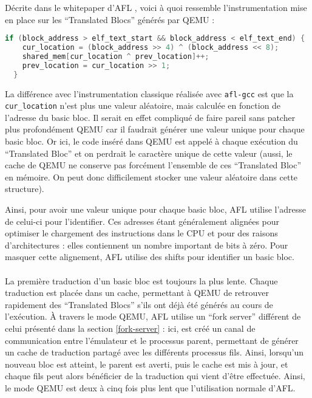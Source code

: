 Décrite dans le whitepaper d'AFL \cite[section 12 : ``Binary only instrumentation'']{technical-details}, voici à quoi ressemble l'instrumentation mise en place sur les ``Translated Blocs'' générés par QEMU :
\begin{lstlisting}[language=C]
  if (block_address > elf_text_start && block_address < elf_text_end) {
    cur_location = (block_address >> 4) ^ (block_address << 8);
    shared_mem[cur_location ^ prev_location]++;
    prev_location = cur_location >> 1;
  }
\end{lstlisting}

La différence avec l'instrumentation classique réalisée avec \lstinline{afl-gcc} est que la \lstinline{cur_location} n'est plus une valeur aléatoire, mais calculée en fonction de l'adresse du basic bloc.
Il serait en effet compliqué de faire pareil sans patcher plus profondément QEMU car il faudrait générer une valeur unique pour chaque basic bloc.
Or ici, le code inséré dans QEMU est appelé à chaque exécution du ``Translated Bloc'' et on perdrait le caractère unique de cette valeur (aussi, le cache de QEMU ne conserve pas forcément l'ensemble de ces ``Translated Bloc'' en mémoire. On peut donc difficilement stocker une valeur aléatoire dans cette structure).

Ainsi, pour avoir une valeur unique pour chaque basic bloc, AFL utilise l'adresse de celui-ci pour l'identifier.
Ces adresses étant généralement alignées pour optimiser le chargement des instructions dans le CPU et pour des raisons d'architectures : elles contiennent un nombre important de bits à zéro.
Pour masquer cette alignement, AFL utilise des shifts pour identifier un basic bloc.


\paragraph{}
La première traduction d'un basic bloc est toujours la plus lente.
Chaque traduction est placée dans un cache, permettant à QEMU de retrouver rapidement des ``Translated Blocs'' s'ils ont déjà été générés au cours de l'exécution.
À travers le mode QEMU, AFL utilise un ``fork server'' différent de celui présenté dans la section \ref{fork-server} : ici, est créé un canal de communication entre l'émulateur et le processus parent, permettant de générer un cache de traduction partagé avec les différents processus fils.
Ainsi, lorsqu'un nouveau bloc est atteint, le parent est averti, puis le cache est mis à jour, et chaque fils peut alors bénéficier de la traduction qui vient d'être effectuée.
Ainsi, le mode QEMU est deux à cinq fois plus lent que l'utilisation normale d'AFL.

